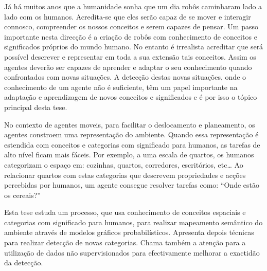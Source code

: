 Já há muitos anos que a humanidade sonha que um dia robôs caminharam lado a lado com os humanos.
Acredita-se que eles serão capaz de se mover e interagir connosco, compreender os nossos conceitos
e serem capazes de pensar.
Um passo importante nesta direcção é a criação de robôs com conhecimento de conceitos e significados
próprios do mundo humano.
No entanto é irrealista acreditar que será possível descrever e representar em toda a sua extensão
tais conceitos. Assim os agentes deverão ser capazes de aprender e adaptar o seu conhecimento quando
confrontados com novas situações.
A detecção destas novas situações, onde o conhecimento de um agente não é suficiente, têm um papel importante
na adaptação e aprendizagem de novos conceitos e significados e é por isso o tópico principal desta tese.

No contexto de agentes moveis, para facilitar o deslocamento e planeamento, os
agentes constroem uma representação do ambiente. Quando essa representação é estendida com
conceitos e categorias com significado para humanos, as tarefas de alto nível ficam mais fáceis.
Por exemplo, a uma escala de quartos, os humanos categorizam o espaço em: cozinhas, quartos, corredores,
escritórios, etc\dots
Ao relacionar quartos com estas categorias que descrevem propriedades e acções percebidas por
humanos, um agente consegue resolver tarefas como: ``Onde estão os cereais?''

Esta tese estuda um processo, que usa conhecimento de conceitos espaciais e categorias com significado
para humanos, para realizar mapeamento semântico do ambiente através de modelos gráficos probabilísticos.
Apresenta depois técnicas para realizar detecção de novas categorias. Chama também a atenção para a
utilização de dados não supervisionados para efectivamente melhorar a exactidão da detecção.


